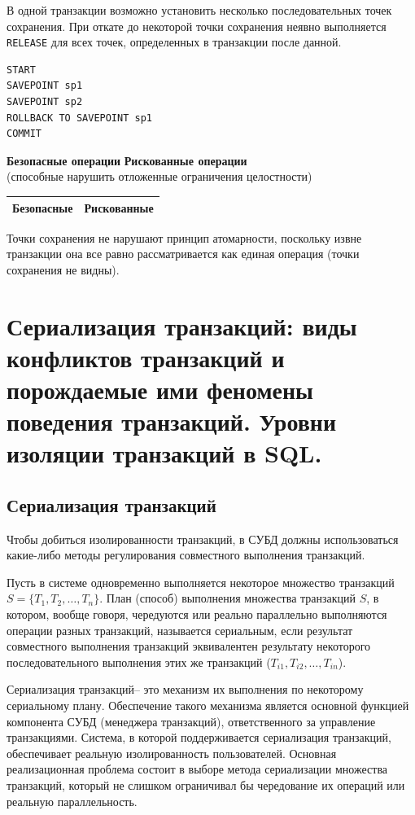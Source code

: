 \documentclass[a4paper,12pt]{article}
\begin{document}
В одной транзакции возможно установить несколько последовательных точек сохранения. При откате до некоторой точки сохранения неявно выполняется \texttt{RELEASE} для всех точек, определенных в транзакции после данной.

\begin{lstlisting}
START
SAVEPOINT sp1
SAVEPOINT sp2
ROLLBACK TO SAVEPOINT sp1
COMMIT
\end{lstlisting}

\textbf{Безопасные операции} \hfill \textbf{Рискованные операции} \\
(способные нарушить отложенные ограничения целостности) \\
\begin{tabular}{|c|c|}
    \hline
    \textbf{Безопасные} & \textbf{Рискованные} \\
    \hline
    \end{tabular}

Точки сохранения не нарушают принцип атомарности, поскольку извне транзакции она все равно рассматривается как единая операция (точки сохранения не видны).



\section{Сериализация транзакций: виды конфликтов транзакций и порождаемые ими феномены поведения транзакций. Уровни изоляции транзакций в SQL.}

\subsection{Сериализация транзакций}

Чтобы добиться изолированности транзакций, в СУБД должны использоваться какие-либо методы регулирования совместного выполнения транзакций.

Пусть в системе одновременно выполняется некоторое множество транзакций $S = \{T_1, T_2, \ldots, T_n\}$. План (способ) выполнения множества транзакций $S$, в котором, вообще говоря, чередуются или реально параллельно выполняются операции разных транзакций, называется сериальным, если результат совместного выполнения транзакций эквивалентен результату некоторого последовательного выполнения этих же транзакций ($T_{i1}, T_{i2}, \ldots, T_{in}$).

Сериализация транзакций– это механизм их выполнения по некоторому сериальному плану. Обеспечение такого механизма является основной функцией компонента СУБД (менеджера транзакций), ответственного за управление транзакциями. Система, в которой поддерживается сериализация транзакций, обеспечивает реальную изолированность пользователей. Основная реализационная проблема состоит в выборе метода сериализации множества транзакций, который не слишком ограничивал бы чередование их операций или реальную параллельность.
\end{document}
